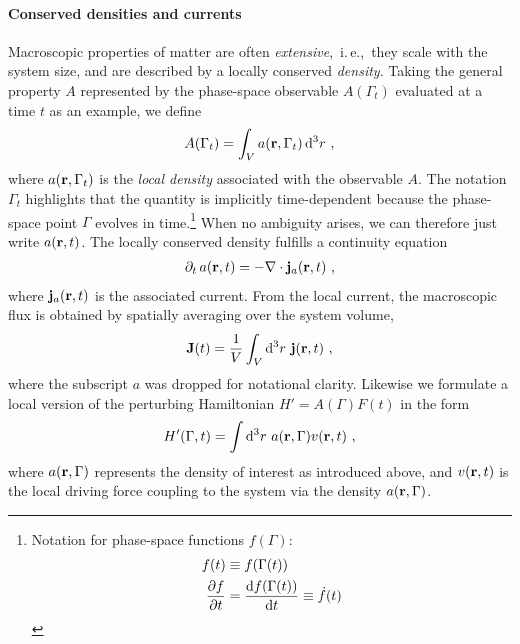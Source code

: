 \paragraph{Conserved densities and currents}
Macroscopic properties of matter are often \emph{extensive},~i.\,e.,~they scale with the system size, and are described by a locally conserved \emph{density}. Taking the general property $A$ represented by the phase-space observable $A(\Gamma_t)$ evaluated at a time $t$ as an example, we define
\begin{align}
  A (\Gamma_t) = \int_V a ({\bf r}, \Gamma_t) \, {\rm d}^3 r~,
  \label{eq:lr.A}
\end{align}
where $a({\bf r}, \Gamma_t)$ is the \emph{local density} associated with the observable $A$. The notation $\Gamma_t$ highlights that the quantity is implicitly time-dependent because the phase-space point $\Gamma$ evolves in time.\footnote{
	Notation for phase-space functions $f (\Gamma)$:
	\begin{align}
	f(t) &\equiv f(\Gamma (t)) \\
	\frac{\partial f}{\partial t} &= \frac{{\rm d} f (\Gamma (t))}{{\rm d} t} \equiv \dot{f}(t)
	\end{align}
	} 
When no ambiguity arises, we can therefore just write $a ({\bf r}, t)$. The locally conserved density fulfills a continuity equation
\begin{align}
  \partial_t \, a({\bf r}, t) = - {\bf \nabla} \cdot {\bf j}_a ({\bf r}, t)~,
  \label{eq:lr.continuity.1}
\end{align}
where ${\bf j}_a ({\bf r}, t)$ is the associated current. From the local current, the macroscopic flux is obtained by spatially averaging over the system volume,
\begin{align}
  {\bf J} (t)
    = \frac{1}{V} \int_V {\rm d}^3 r ~ {\bf j} ({\bf r}, t)~,
  \label{eq:lr.J(t)}
\end{align}
where the subscript $a$ was dropped for notational clarity.
Likewise we formulate a local version of the perturbing Hamiltonian \mbox{$H' = A (\Gamma) F(t)$} in the form
\begin{align}
	H' (\Gamma, t) = \int {\rm d}^3 r ~ a ({\bf r}, \Gamma) v({\bf r}, t)~,
	\label{eq:lr.H'}
\end{align}
where $a({\bf r}, \Gamma)$ represents the density of interest as introduced above, and $v({\bf r}, t)$ is the local driving force coupling to the system via the density $a ({\bf r}, \Gamma)$.

